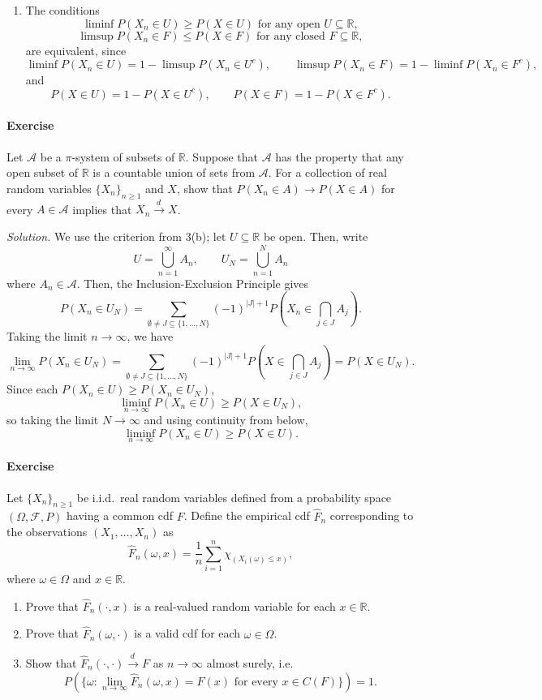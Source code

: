 \documentclass[10pt]{article}
\newcounter{prob}
\newcommand{\problem}{\stepcounter{prob}\paragraph{Exercise \arabic{prob}}}
\newcommand{\solution}{\textit{Solution.} }
\newcommand{\R}{\mathbb{R}}
\newcommand{\tod}{\overset{d\,}{\longrightarrow}}
\begin{document}
\begin{enumerate}
        \item The conditions \[
            \liminf P(X_n \in U) \geq P(X \in U) \text{ for any open
                        } U \subseteq \R,
        \] \[
            \limsup P(X_n \in F) \leq P(X \in F) \text{ for any
                        closed } F \subseteq \R,
        \] are equivalent, since \[
            \liminf P(X_n \in U) = 1 - \limsup P(X_n \in U^c), \qquad
            \limsup P(X_n \in F) = 1 - \liminf P(X_n \in F^c),
        \] and \[
            P(X \in U) = 1 - P(X \in U^c), \qquad
            P(X \in F) = 1 - P(X \in F^c).
        \]
    \end{enumerate}


    \problem Let $\mathcal{A}$ be a $\pi$-system of subsets of $\R$. Suppose that
    $\mathcal{A}$ has the property that any open subset of $\R$ is a countable union
    of sets from $\mathcal{A}$. For a collection of real random variables $\{X_n\}_{n
    \geq 1}$ and $X$, show that $P(X_n \in A) \to P(X \in A)$ for every $A \in
    \mathcal{A}$ implies that $X_n \tod X$.

    \solution We use the criterion from 3(b); let $U \subseteq \R$ be open. Then,
    write \[
        U = \bigcup_{n = 1}^\infty A_n, \qquad
        U_N = \bigcup_{n = 1}^N A_n
    \] where $A_n \in \mathcal{A}$. Then, the Inclusion-Exclusion Principle gives \[
        P(X_n \in U_N) = \sum_{\emptyset \neq J \subseteq \{1, \dots, N\}} (-1)^{|J|
        + 1} P\left(X_n \in \bigcap_{j \in J} A_j\right).
    \] Taking the limit $n \to \infty$, we have \[
        \lim_{n \to \infty} P(X_n \in U_N) = \sum_{\emptyset \neq J \subseteq \{1,
        \dots, N\}} (-1)^{|J| + 1} P\left(X \in \bigcap_{j \in J} A_j\right)
        = P(X \in U_N).
    \] Since each $P(X_n \in U) \geq P(X_n \in U_N)$, \[
        \liminf_{n \to \infty} P(X_n \in U) \geq P(X \in U_N),
    \] so taking the limit $N \to \infty$ and using continuity from below, \[
        \liminf_{n \to \infty} P(X_n \in U) \geq P(X \in U).
    \]


    \problem Let $\{X_n\}_{n \geq 1}$ be i.i.d.\ real random variables defined from a
    probability space $(\Omega, \mathcal{F}, P)$ having a common cdf $F$. Define the
    empirical cdf $\hat{F}_n$ corresponding to the observations $(X_1, \dots, X_n)$
    as \[
        \hat{F}_n(\omega, x) = \frac{1}{n}\sum_{i = 1}^n \chi_{(X_i(\omega) \leq x)},
    \] where $\omega \in \Omega$ and $x \in \R$.

    \begin{enumerate}
        \item Prove that $\hat{F}_n(\cdot, x)$ is a real-valued random variable for
        each $x \in \R$.

        \item Prove that $\hat{F}_n(\omega, \cdot)$ is a valid cdf for each $\omega
        \in \Omega$.

        \item Show that $\hat{F}_n(\cdot, \cdot) \tod F$ as $n \to \infty$ almost
        surely, i.e.\ \[
            P(\{\omega : \lim_{n \to \infty} \hat{F}_n(\omega, x) = F(x) \text{ for
            every } x \in C(F)\}) = 1.
        \]
    \end{enumerate}
\end{document}
